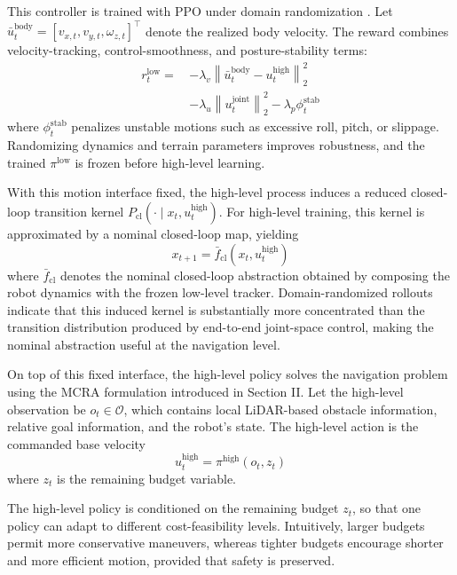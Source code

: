 \documentclass[conference]{IEEEtran}
\begin{document}
This controller is trained with PPO under domain randomization \cite{DBLP:journals/corr/SchulmanWDRK17,DBLP:conf/iros/TobinFRSZA17}. Let $\bar{u}_t^{\mathrm{body}}=[v_{x,t},v_{y,t},\omega_{z,t}]^{\top}$ denote the realized body velocity. The reward combines velocity-tracking, control-smoothness, and posture-stability terms:
\begin{equation}
\begin{aligned}
r_t^{\mathrm{low}}
=\,&-\lambda_v \left\| \bar{u}_t^{\mathrm{body}}-u_t^{\mathrm{high}} \right\|_2^2 \\
&-\lambda_u \left\| u_t^{\mathrm{joint}} \right\|_2^2 -\lambda_p \phi_t^{\mathrm{stab}}
\end{aligned}
\end{equation}
where $\phi_t^{\mathrm{stab}}$ penalizes unstable motions such as excessive roll, pitch, or slippage. Randomizing dynamics and terrain parameters improves robustness, and the trained $\pi^{\mathrm{low}}$ is frozen before high-level learning.

With this motion interface fixed, the high-level process induces a reduced closed-loop transition kernel $P_{\mathrm{cl}}(\cdot\mid x_t,u_t^{\mathrm{high}})$. For high-level training, this kernel is approximated by a nominal closed-loop map, yielding
\begin{equation}
x_{t+1}=\bar{f}_{\mathrm{cl}}\!\left(x_t,u_t^{\mathrm{high}}\right)
\end{equation}
where $\bar{f}_{\mathrm{cl}}$ denotes the nominal closed-loop abstraction obtained by composing the robot dynamics with the frozen low-level tracker. Domain-randomized rollouts indicate that this induced kernel is substantially more concentrated than the transition distribution produced by end-to-end joint-space control, making the nominal abstraction useful at the navigation level.

On top of this fixed interface, the high-level policy solves the navigation problem using the MCRA formulation introduced in Section II. Let the high-level observation be $o_t \in \mathcal{O}$, which contains local LiDAR-based obstacle information, relative goal information, and the robot's state. The high-level action is the commanded base velocity
\begin{equation}
u_t^{\mathrm{high}}=\pi^{\mathrm{high}}(o_t,z_t)
\end{equation}
where $z_t$ is the remaining budget variable.

The high-level policy is conditioned on the remaining budget $z_t$, so that one policy can adapt to different cost-feasibility levels. Intuitively, larger budgets permit more conservative maneuvers, whereas tighter budgets encourage shorter and more efficient motion, provided that safety is preserved.
\end{document}
